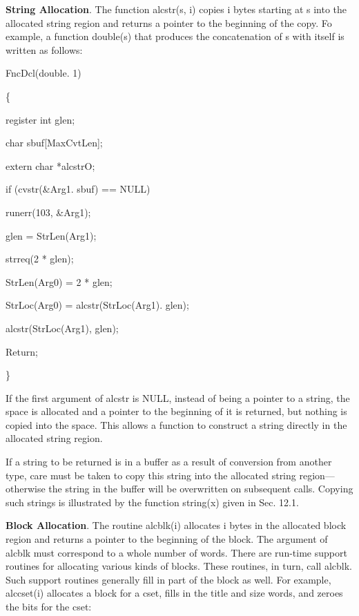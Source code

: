 \textbf{String Allocation}. The function alcstr(s, i) copies i bytes
starting at s into the allocated string region and returns a pointer
to the beginning of the copy. Fo example, a function double(s) that
produces the concatenation of s with itself is written as follows:

{\ttfamily\mdseries
FncDcl(double. 1)}

{\ttfamily\mdseries
\{}

{\ttfamily\mdseries
register int glen;}

{\ttfamily\mdseries
char sbuf[MaxCvtLen];}

{\ttfamily\mdseries
extern char *alcstrO;}

{\ttfamily\mdseries
if (cvstr(\&Arg1. sbuf) == NULL)}

{\ttfamily\mdseries
runerr(103, \&Arg1);}

{\ttfamily\mdseries
glen = StrLen(Arg1);}

{\ttfamily\mdseries
strreq(2 * glen);}

{\ttfamily\mdseries
StrLen(Arg0) = 2 * glen;}

{\ttfamily\mdseries
StrLoc(Arg0) = alcstr(StrLoc(Arg1). glen);}

{\ttfamily\mdseries
alcstr(StrLoc(Arg1), glen);}

{\ttfamily\mdseries
Return;}

{\ttfamily\mdseries
\}}


If the first argument of alcstr is NULL, instead of being a pointer to
a string, the space is allocated and a pointer to the beginning of it
is returned, but nothing is copied into the space. This allows a
function to construct a string directly in the allocated string
region.

If a string to be returned is in a buffer as a result of conversion
from another type, care must be taken to copy this string into the
allocated string region---otherwise the string in the buffer will
be overwritten on subsequent calls. Copying such strings is
illustrated by the function string(x) given in Sec. 12.1.

\textbf{Block Allocation}. The routine alcblk(i) allocates i bytes in
the allocated block region and returns a pointer to the beginning of
the block. The argument of alcblk must correspond to a whole number of
words. There are run-time support routines for allocating various
kinds of blocks. These routines, in turn, call alcblk. Such support
routines generally fill in part of the block as well. For example,
alccset(i) allocates a block for a cset, fills in the title and size
words, and zeroes the bits for the cset:

